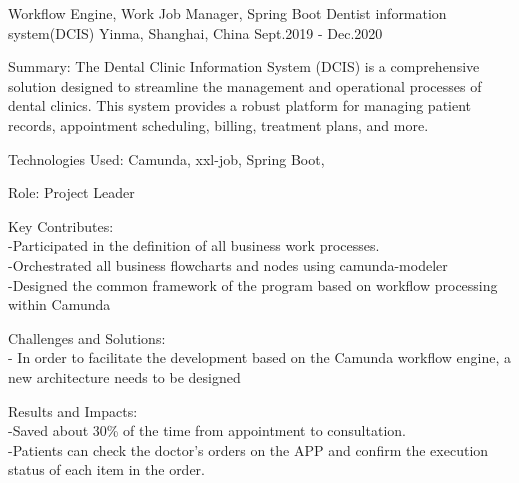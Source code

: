 \begin{cventries}
{\begin{cvitems}
      \end{cvitems}
    }
  \cventry
    {Workflow Engine, Work Job Manager, Spring Boot} %
    {Dentist information system({DCIS})} %
    {Yinma, Shanghai, China} %
    {Sept.2019 - Dec.2020} %
    {
      \begin{cvitems} %
        \item {Summary: The Dental Clinic Information System (DCIS) is a comprehensive solution designed to streamline the management and operational processes of dental clinics. This system provides a robust platform for managing patient records, appointment scheduling, billing, treatment plans, and more.}
        \item {Technologies Used: Camunda, xxl-job, Spring Boot, }
        \item {Role: Project Leader}
        \item {Key Contributes:  \\-Participated in the definition of all business work processes. \\-Orchestrated all business flowcharts and nodes using camunda-modeler \\-Designed the common framework of the program based on workflow processing within Camunda}
        \item {Challenges and Solutions: \\- In order to facilitate the development based on the Camunda workflow engine, a new architecture needs to be designed}
        \item {Results and Impacts: \\-Saved about 30\% of the time from appointment to  consultation. \\-Patients can check the doctor's orders on the APP and confirm the execution status of each item in the order.}
      \end{cvitems}
    }




\end{cventries}
